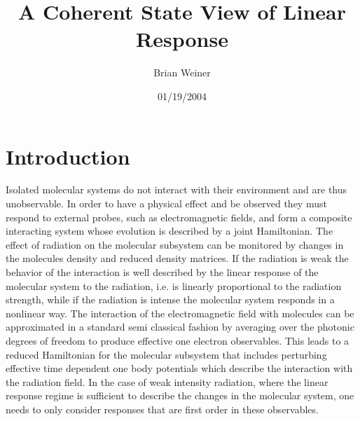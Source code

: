 \documentclass[aps,preprint]{revtex4}%
\begin{document}
\preprint{ }
\title[Coh. State Lin. Res..]{A Coherent State View of Linear Response}
\author{Brian Weiner}
\keywords{}

\begin{abstract}


\end{abstract}
\date{01/19/2004}
\maketitle
\tableofcontents


\section{Introduction\label{intro}}

Isolated molecular systems do not interact with their environment and are thus
unobservable. In order to have a physical effect and be observed they must
respond to external probes, such as electromagnetic fields, and form a
composite interacting system whose evolution is described by a joint
Hamiltonian. The effect of radiation on the molecular subsystem can be
monitored by changes in the molecules density and reduced density matrices. If
the radiation is weak the behavior of the interaction is well described by the
linear response of the molecular system to the radiation, i.e. is linearly
proportional to the radiation strength, while if the radiation is intense the
molecular system responds in a nonlinear way. The interaction of the
electromagnetic field with molecules can be approximated in a standard semi
classical fashion by averaging over the photonic degrees of freedom to produce
effective one electron observables. This leads to a reduced Hamiltonian for
the molecular subsystem that includes perturbing effective time dependent one
body potentials which describe the interaction with the radiation field. In
the case of weak intensity radiation, where the linear response regime is
sufficient to describe the changes in the molecular system, one needs to only
consider responses that are first order in these observables.
\end{document}
